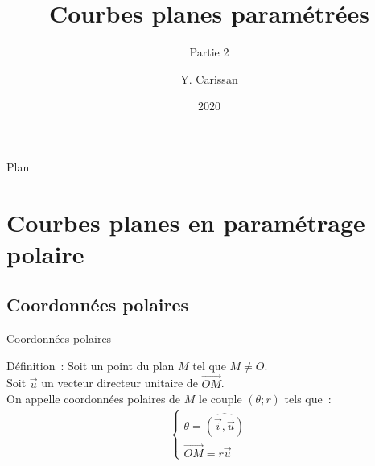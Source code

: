 \documentclass[14pt]{beamer}
\title{Courbes planes paramétrées}
\subtitle{Partie 2}
\author{Y. Carissan}
\date{2020}
\begin{document}
\begin{frame}{}
\maketitle
\end{frame}

\begin{frame}{Plan}
        \tableofcontents[hideallsubsections]
\end{frame}

\section{Courbes planes en paramétrage polaire}
\subsection{Coordonnées polaires}
\begin{frame}{Coordonnées polaires}
        \begin{alertblock}{Définition~:}
                Soit un point du plan $M$ tel que $M\ne O$.\\
                Soit $\vec{u}$ un vecteur directeur unitaire de $\vec{OM}$.\\
                On appelle coordonnées polaires de $M$ le couple $(\theta;r)$
                tels que~:
                \begin{align*}
                        \left\{\begin{array}{l}
                                \theta = \widehat{(\vec{i}, \vec{u})}\\
                                \vec{OM} = r\vec{u}
                        \end{array}\right.
                \end{align*}
        \end{alertblock}
\end{frame}
\end{document}
